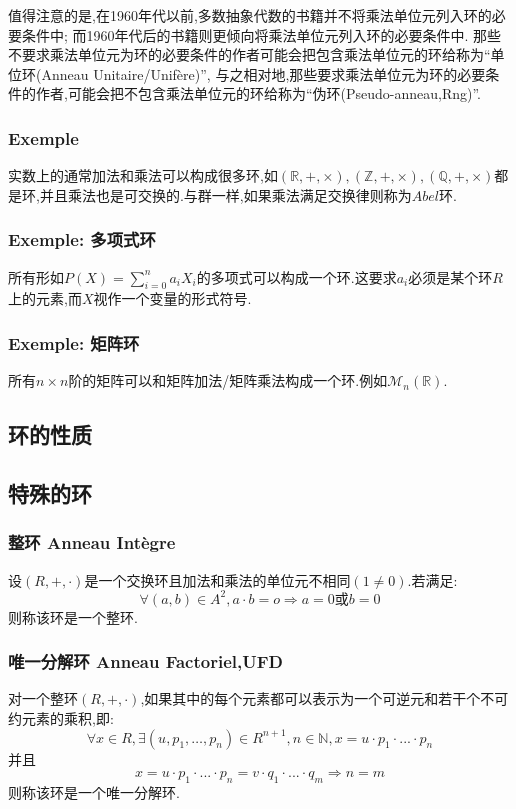 \documentclass[12pt, a4paper, oneside]{ctexbook}
\newcommand{\R }{\mathbb{R}}%
\begin{document}
  \indent
  值得注意的是,在1960年代以前,多数抽象代数的书籍并不将乘法单位元列入环的必要条件中;
  而1960年代后的书籍则更倾向将乘法单位元列入环的必要条件中.
  那些不要求乘法单位元为环的必要条件的作者可能会把包含乘法单位元的环给称为“单位环(Anneau Unitaire/Unifère)”,
  与之相对地,那些要求乘法单位元为环的必要条件的作者,可能会把不包含乘法单位元的环给称为“伪环(Pseudo-anneau,Rng)”.
  \subsubsection{Exemple}
  实数上的通常加法和乘法可以构成很多环,如$(\R,+,\times),(\mathbb{Z},+,\times),(\mathbb{Q},+,\times)$都是环,并且乘法也是可交换的.与群一样,如果乘法满足交换律则称为$Abel$环.
  \subsubsection{Exemple: 多项式环}
  所有形如$P(X)=\sum_{i=0}^{n}a_iX_i $的多项式可以构成一个环.这要求$a_i$必须是某个环$R$上的元素,而$X$视作一个变量的形式符号.
  \subsubsection{Exemple: 矩阵环}
  所有$n\times n$阶的矩阵可以和矩阵加法/矩阵乘法构成一个环.例如$\mathcal{M}_n(\R)$.
  \subsection{环的性质}

  \subsection{特殊的环}
  \subsubsection{整环 Anneau Intègre}
  设$(R,+,\cdot)$是一个交换环且加法和乘法的单位元不相同$(1\neq 0)$.若满足:
  $$
  \forall (a,b)\in A^2,a\cdot b=o\Rightarrow a=0\text{或}b=0
  $$则称该环是一个整环.
  \subsubsection{唯一分解环 Anneau Factoriel,UFD}
  对一个整环$(R,+,\cdot)$,如果其中的每个元素都可以表示为一个可逆元和若干个不可约元素的乘积,即:
  $$
  \forall x\in R,\exists (u,p_1,\dots,p_n)\in R^{n+1},n\in \mathbb{N},x=u\cdot p_1\cdot...\cdot p_n
  $$
  并且
  $$
  x=u\cdot p_1\cdot...\cdot p_n=v\cdot q_1\cdot...\cdot q_m\Rightarrow n=m
  $$
  则称该环是一个唯一分解环.
\end{document}
